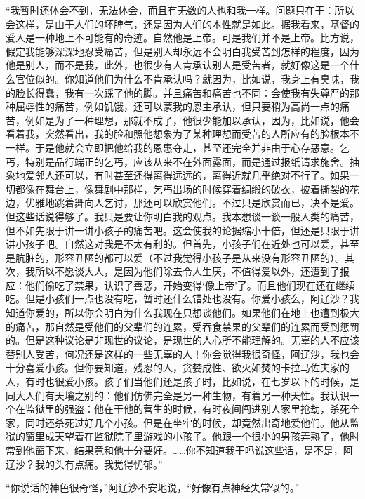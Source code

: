 \par “我暂时还体会不到，无法体会，而且有无数的人也和我一样。问题只在于：所以会这样，是由于人们的坏脾气，还是因为人们的本性就是如此。据我看来，基督的爱人是一种地上不可能有的奇迹。自然他是上帝。可是我们并不是上帝。比方说，假定我能够深深地忍受痛苦，但是别人却永远不会明白我受苦到怎样的程度，因为他是别人，而不是我，此外，也很少有人肯承认别人是受苦者，就好像这是一个什么官位似的。你知道他们为什么不肯承认吗？就因为，比如说，我身上有臭味，我的脸长得蠢，我有一次踩了他的脚。并且痛苦和痛苦也不同：会使我有失尊严的那种屈辱性的痛苦，例如饥饿，还可以蒙我的恩主承认，但只要稍为高尚一点的痛苦，例如是为了一种理想，那就不成了，他很少能加以承认，因为，比如说，他会看着我，突然看出，我的脸和照他想象为了某种理想而受苦的人所应有的脸根本不一样。于是他就会立即把他给我的恩惠夺走，甚至还完全并非由于心存恶意。乞丐，特别是品行端正的乞丐，应该从来不在外面露面，而是通过报纸请求施舍。抽象地爱邻人还可以，有时甚至还得离得远远的，离得近就几乎绝对不行了。如果一切都像在舞台上，像舞剧中那样，乞丐出场的时候穿着绸缎的破衣，披着撕裂的花边，优雅地跳着舞向人乞讨，那还可以欣赏他们。不过只是欣赏而已，决不是爱。但这些话说得够了。我只是要让你明白我的观点。我本想谈一谈一般人类的痛苦，但不如先限于讲一讲小孩子的痛苦吧。这会使我的论据缩小十倍，但还是只限于讲讲小孩子吧。自然这对我是不太有利的。但首先，小孩子们在近处也可以爱，甚至是肮脏的，形容丑陋的都可以爱（不过我觉得小孩子是从来没有形容丑陋的）。其次，我所以不愿谈大人，是因为他们除去令人生厌，不值得爱以外，还遭到了报应：他们偷吃了禁果，认识了善恶，开始变得‘像上帝’了。而且他们现在还在继续吃。但是小孩们一点也没有吃，暂时还什么错处也没有。你爱小孩么，阿辽沙？我知道你爱的，所以你会明白为什么我现在只想谈他们。如果他们在地上也遭到极大的痛苦，那自然是受他们的父辈们的连累，受吞食禁果的父辈们的连累而受到惩罚的。但是这种议论是非现世的议论，是现世的人心所不能理解的。无辜的人不应该替别人受苦，何况还是这样的一些无辜的人！你会觉得我很奇怪，阿辽沙，我也会十分喜爱小孩。但你要知道，残忍的人，贪婪成性、欲火如焚的卡拉马佐夫家的人，有时也很爱小孩。孩子们当他们还是孩子时，比如说，在七岁以下的时候，是同大人们有天壤之别的：他们仿佛完全是另一种生物，有着另一种天性。我认识一个在监狱里的强盗：他在干他的营生的时候，有时夜间闯进别人家里抢劫，杀死全家，同时还杀死过好几个小孩。但是在坐牢的时候，却竟然出奇地爱他们。他从监狱的窗里成天望着在监狱院子里游戏的小孩子。他跟一个很小的男孩弄熟了，他时常到他窗下来，结果竟和他十分要好。……你不知道我干吗说这些话，是不是，阿辽沙？我的头有点痛。我觉得忧郁。”
\par “你说话的神色很奇怪，”阿辽沙不安地说，“好像有点神经失常似的。”
